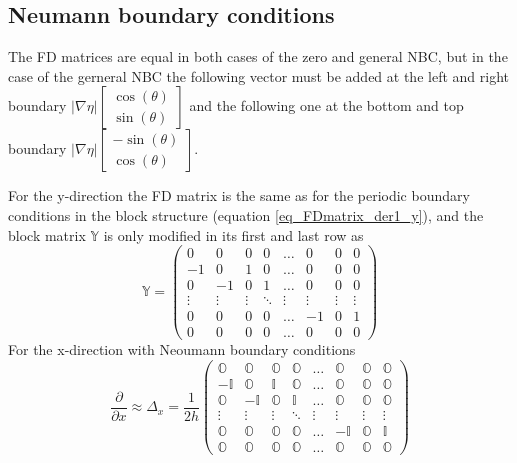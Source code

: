 \subsection*{Neumann boundary conditions}
The FD matrices are equal in both cases of the zero and general NBC, but in the case of the gerneral NBC the following vector must be added at the left and right boundary $|\nabla\eta|\left[\begin{array}{c}
	\cos(\theta)  \\
	\sin(\theta) 
\end{array}\right]$ and the following one at the bottom and top boundary  $|\nabla\eta|\left[\begin{array}{c}
	-\sin(\theta)  \\
	\cos(\theta)
\end{array}\right]$.

For the y-direction the FD matrix is the same as for the periodic boundary conditions in the block structure (equation \ref{eq_FDmatrix_der1_y}), and the block matrix $\mathbb{Y}$ is only modified in its first and last row as
\begin{equation}
	\mathbb{Y} = \left(\begin{array}{cccccccc}
		0 & 0 & 0&  0 & \dots & 0 & 0 & 0 \\
		-1 & 0 &  1& 0 & \dots& 0 & 0 & 0\\
		0 &-1&0 & 1 & \dots & 0 & 0 & 0\\
		\vdots&\vdots&\vdots&\ddots &\vdots&\vdots&\vdots&\vdots\\
		0 & 0 & 0 &0 &  \dots & -1 & 0 & 1 \\
		0 & 0 & 0 &0 &  \dots & 0 &0  &0
	\end{array}\right)
\end{equation}
For the x-direction with Neoumann boundary conditions
\begin{equation}
	\frac{\partial }{\partial x} \approx \Delta_x = \frac{1}{2h}
	\left(\begin{array}{cccccccc}
		\mathbb{O} & \mathbb{O} & \mathbb{O}& \mathbb{O}&\dots &\mathbb{O} &  \mathbb{O} &  \mathbb{O}  \\
		-\mathbb{I}&\mathbb{O} &  \mathbb{I}& \mathbb{O}&\dots&\mathbb{O}&  \mathbb{O}&\mathbb{O}\\
		\mathbb{O}& -\mathbb{I}&\mathbb{O} & \mathbb{I}& \dots & \mathbb{O}&  \mathbb{O}&  \mathbb{O}\\
		\vdots&\vdots&\vdots&\ddots &\vdots&\vdots&\vdots&\vdots\\
		\mathbb{O}&\mathbb{O}&\mathbb{O}&\mathbb{O}&\dots & -\mathbb{I}&  \mathbb{O} & \mathbb{I} \\
		\mathbb{O} &\mathbb{O} &\mathbb{O}&\mathbb{O}&\dots &\mathbb{O}& \mathbb{O} &\mathbb{O}
	\end{array}\right)
\end{equation}

